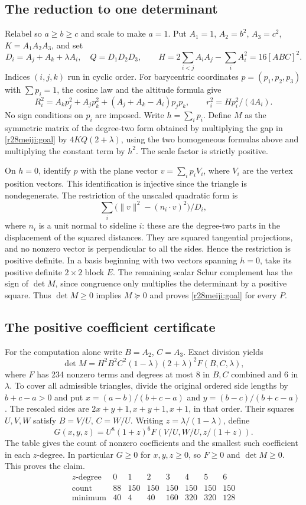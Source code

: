 \documentclass[11pt,a4paper]{article}
\numberwithin{equation}{section}
\theoremstyle{definition}
\theoremstyle{remark}
\begin{document}
\subsection*{The reduction to one determinant}
Relabel so $a\ge b\ge c$ and scale to make $a=1$. Put
$A_1=1$, $A_2=b^2$, $A_3=c^2$, $K=A_1A_2A_3$, and set
\[
 D_i=A_j+A_k+\lambda A_i,\quad Q=D_1D_2D_3,\qquad
 H=2\!\sum_{i<j}A_i A_j-\sum_i A_i^2=16[ABC]^2.
\]
Indices $(i,j,k)$ run in cyclic order.
For barycentric coordinates $p=(p_1,p_2,p_3)$ with $\sum p_i=1$,
the cosine law and the altitude formula give
\[
 R_i^2=A_k p_j^2+A_j p_k^2+(A_j+A_k-A_i)p_jp_k,
 \qquad r_i^2=H p_i^2/(4A_i).
\]
No sign conditions on $p_i$ are imposed. Write $h=\sum_i p_i$.
Define $M$ as the symmetric matrix of the degree-two form obtained
by multiplying the gap in \eqref{r28meiji:goal} by $4KQ(2+\lambda)$, using
the two homogeneous formulas above and multiplying the constant term
by $h^2$. The scale factor is strictly positive.

On $h=0$, identify $p$ with the plane vector $v=\sum_i p_i V_i$,
where $V_i$ are the vertex position vectors. This identification is
injective since the triangle is nondegenerate. The restriction of the
unscaled quadratic form is
\[
 \sum_i \big(\lVert v\rVert^2-(n_i\cdot v)^2\big)/D_i,
\]
where $n_i$ is a unit normal to sideline $i$: these are the
degree-two parts in the displacement of the squared distances.
They are squared tangential projections, and no nonzero vector is
perpendicular to all the sides. Hence the restriction is positive
definite. In a basis beginning with two vectors spanning $h=0$, take
its positive definite $2\times2$ block $E$. The remaining scalar Schur
complement has the sign of $\det M$, since congruence only multiplies
the determinant by a positive square. Thus $\det M\geq0$ implies
$M\succeq0$ and proves \eqref{r28meiji:goal} for every $P$.

\subsection*{The positive coefficient certificate}
For the computation alone write $B=A_2$, $C=A_3$.
Exact division yields
\[
 \det M=H^2 B^2 C^2(1-\lambda)(2+\lambda)^2 F(B,C,\lambda),
\]
where $F$ has 234 nonzero terms and degrees at most 8 in $B,C$
combined and 6 in $\lambda$. To cover all admissible triangles,
divide the original ordered side lengths by $b+c-a>0$ and put
$x=(a-b)/(b+c-a)$ and $y=(b-c)/(b+c-a)$. The rescaled sides are
$2x+y+1,x+y+1,x+1$, in that order. Their squares $U,V,W$ satisfy
$B=V/U$, $C=W/U$. Writing $z=\lambda/(1-\lambda)$, define
\[
 G(x,y,z)=U^8(1+z)^6 F\!\left(V/U,W/U,z/(1+z)\right).
\]
The table gives the count of nonzero coefficients and the smallest
such coefficient in each $z$-degree. In particular $G\geq0$ for
$x,y,z\geq0$, so $F\geq0$ and $\det M\geq0$. This proves the claim.
\[
\begin{array}{c|rrrrrrr}
z\text{-degree}&0&1&2&3&4&5&6\\\hline
\text{count}&88&150&150&150&150&150&150\\
\text{minimum}&40&4&40&160&320&320&128
\end{array}
\]
\end{document}
